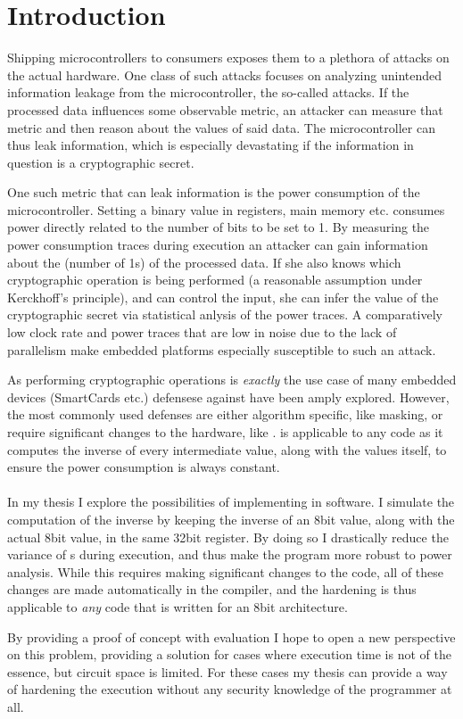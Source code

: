 \section{Introduction}
Shipping microcontrollers to consumers exposes them to a plethora of attacks on the actual hardware.
One class of such attacks focuses on analyzing unintended information leakage from the microcontroller, the so-called \sidechannel{} attacks.
If the processed data influences some observable metric, an attacker can measure that metric and then reason about the values of said data.
The microcontroller can thus leak information, which is especially devastating if the information in question is a cryptographic secret.

One such metric that can leak information is the power consumption of the microcontroller.
Setting a binary value in registers, main memory etc. consumes power directly related to the number of bits to be set to 1.
By measuring the power consumption traces during execution an attacker can gain information about the \hammingw{} (number of 1s) of the processed data.
If she also knows which cryptographic operation is being performed (a reasonable assumption under Kerckhoff's principle), and can control the input, she can infer the value of the cryptographic secret via statistical anlysis of the power traces.
A comparatively low clock rate and power traces that are low in noise due to the lack of parallelism make embedded platforms especially susceptible to such an attack.

As performing cryptographic operations is \emph{exactly} the use case of many embedded devices (SmartCards etc.) defensese against \poweranalysis{} have been amply explored.
However, the most commonly used defenses are either algorithm specific, like masking, or require significant changes to the hardware, like \dual{}.
\dual{} is applicable to any code as it computes the inverse of every intermediate value, along with the values itself, to ensure the power consumption is always constant.
\\
\\
In my thesis I explore the possibilities of implementing \dual{} in software.
I simulate the computation of the inverse by keeping the inverse of an 8bit value, along with the actual 8bit value, in the same 32bit register.
By doing so I drastically reduce the variance of \hammingw{}s during execution, and thus make the program more robust to power analysis.
While this requires making significant changes to the code, all of these changes are made automatically in the compiler, and the hardening is thus applicable to \emph{any} code that is written for an 8bit architecture.

By providing a proof of concept with evaluation I hope to open a new perspective on this problem, providing a solution for cases where execution time is not of the essence, but circuit space is limited.
For these cases my thesis can provide a way of hardening the execution without any security knowledge of the programmer at all.
